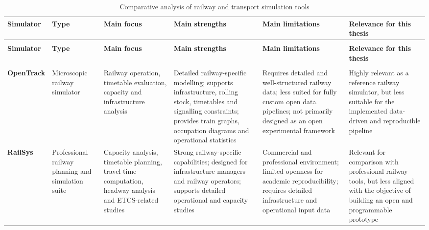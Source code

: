 \begin{small}
\begin{longtable}{
    >{\raggedright\arraybackslash}p{1.8cm}
    >{\raggedright\arraybackslash}p{2.0cm}
    >{\raggedright\arraybackslash}p{2.2cm}
    >{\raggedright\arraybackslash}p{2.8cm}
    >{\raggedright\arraybackslash}p{2.8cm}
    >{\raggedright\arraybackslash}p{2.8cm}
}

\caption{Comparative analysis of railway and transport simulation tools}\label{tab:railway_simulators_comparison} \\

\toprule
\textbf{Simulator} &
\textbf{Type} &
\textbf{Main focus} &
\textbf{Main strengths} &
\textbf{Main limitations} &
\textbf{Relevance for this thesis} \\
\midrule
\endfirsthead

\multicolumn{6}{c}{
    \tablename\ \thetable{} -- continued from previous page
} \\
\toprule
\textbf{Simulator} &
\textbf{Type} &
\textbf{Main focus} &
\textbf{Main strengths} &
\textbf{Main limitations} &
\textbf{Relevance for this thesis} \\
\midrule
\endhead

\midrule
\multicolumn{6}{r}{Continued on next page} \\
\endfoot

\bottomrule
\endlastfoot

\textbf{OpenTrack} &
Microscopic railway simulator &
Railway operation, timetable evaluation, capacity and infrastructure analysis &
Detailed railway-specific modelling; supports infrastructure, rolling stock, timetables and signalling constraints; 
provides train graphs, occupation diagrams and operational statistics &
Requires detailed and well-structured railway data; less suited for fully custom open data pipelines; not primarily 
designed as an open experimental framework &
Highly relevant as a reference railway simulator, but less suitable for the implemented data-driven and reproducible 
pipeline \\

\midrule

\textbf{RailSys} &
Professional railway planning and simulation suite &
Capacity analysis, timetable planning, travel time computation, headway analysis and ETCS-related studies &
Strong railway-specific capabilities; designed for infrastructure managers and railway operators; supports detailed 
operational and capacity studies &
Commercial and professional environment; limited openness for academic reproducibility; requires detailed infrastructure and 
operational input data &
Relevant for comparison with professional railway tools, but less aligned with the objective of building an open and 
programmable prototype \\


\end{longtable}
\end{small}
